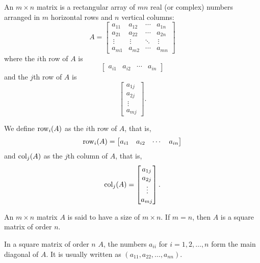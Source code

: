     \begin{dfn}[Matrix]
        An \(m \times n\) matrix is a rectangular array of \(mn\) real (or complex) numbers arranged in \(m\) horizontal rows and \(n\) vertical columns:
        \[A = \begin{bmatrix}
            a_{11} & a_{12} & \cdots & a_{1n} \\
            a_{21} & a_{22} & \cdots & a_{2n} \\
            \,\vdots & \,\vdots & \ddots & \,\vdots \\
            a_{m1} & a_{m2} & \cdots & a_{mn}
        \end{bmatrix}\] where the \(i\)th row of \(A\) is \[\begin{bmatrix}
            a_{i1} & a_{i2} & \cdots & a_{in}
        \end{bmatrix}\] and the \(j\)th row of \(A\) is \[\begin{bmatrix}
            a_{1j} \\ a_{2j} \\ \,\vdots \\ a_{mj}
        \end{bmatrix}.\]
    \end{dfn}

    \begin{dfn}
        We define \(\operatorname{row}_i(A)\) as the \(i\)th row of \(A\), that is, \[\operatorname{row}_i(A) = \begin{bmatrix}
            a_{i1} & a_{i2} & \cdots & a_{in}
        \end{bmatrix}\] and \(\operatorname{col}_j(A)\) as the \(j\)th column of \(A\), that is, \[\operatorname{col}_j(A) = \begin{bmatrix}
            a_{1j} \\ a_{2j} \\ \,\vdots \\ a_{mj}
        \end{bmatrix}.\]
    \end{dfn}

    \begin{dfn}
        An \(m \times n\) matrix \(A\) is said to have a size of \(m \times n\). If \(m = n\), then \(A\) is a square matrix of order \(n\).
    \end{dfn}

    \begin{dfn}
        In a square matrix of order \(n\) \(A\), the numbers \(a_{ii}\) for \(i = 1, 2, \ldots, n\) form the main diagonal of \(A\). It is usually written as \((a_{11}, a_{22}, \ldots, a_{nn})\).
    \end{dfn}


